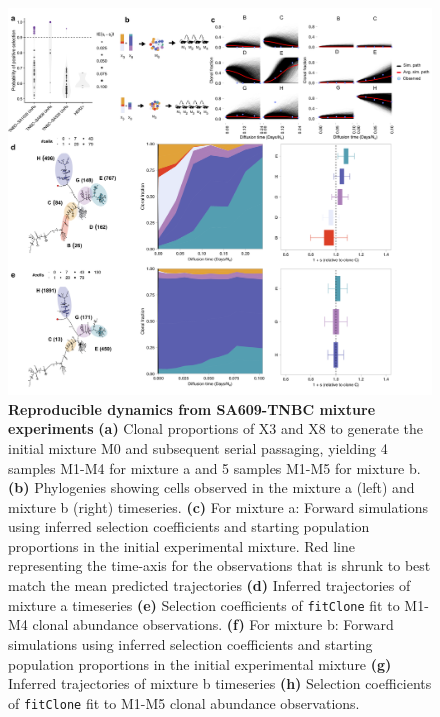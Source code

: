 \begin{figure}
\centering
\includegraphics[width=\textwidth]{Figures/chap4/Mixturenew.png}
	
\caption[Reproducible dynamics from SA609-TNBC mixture experiments]
	{\small
	\textbf{Reproducible dynamics from SA609-TNBC mixture experiments}
	    \textbf{(a)} Clonal proportions of X3 and X8 to generate the initial mixture M0 and subsequent serial passaging, yielding 4 samples M1-M4 for mixture a and 5 samples M1-M5 for mixture b.
	    \textbf{(b)} Phylogenies showing cells observed in the mixture a (left) and mixture b (right) timeseries.
	     \textbf{(c)} For mixture a: Forward simulations using inferred selection coefficients and starting population proportions in the initial experimental mixture. Red line representing the time-axis for the observations that is shrunk to best match the mean predicted trajectories
	     \textbf{(d)} Inferred trajectories of mixture a timeseries \textbf{(e)} Selection coefficients of \texttt{fitClone} fit to M1-M4 clonal abundance observations.
 \textbf{(f)} For mixture b: Forward simulations using inferred selection coefficients and starting population proportions in the initial experimental mixture
  \textbf{(g)} Inferred trajectories of mixture b timeseries
	  \textbf{(h)} Selection coefficients of \texttt{fitClone} fit to M1-M5 clonal abundance observations.    
}
	\label{fig:Mixturenew}
\end{figure}

